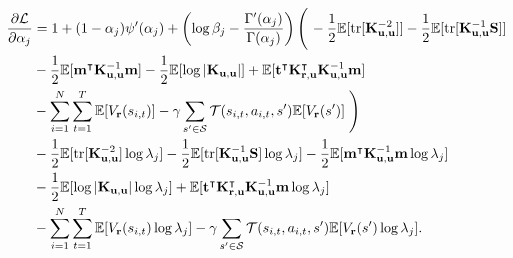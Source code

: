 \documentclass{article}
\theoremstyle{definition}
\theoremstyle{remark}
\DeclareMathOperator{\tr}{tr}
\newcommand{\Kuu}{\mathbf{K}_{\mathbf{u},\mathbf{u}}}
\newcommand{\Kru}{\mathbf{K}_{\mathbf{r},\mathbf{u}}}
\begin{document}
\[
  \begin{split}
    \frac{\partial\mathcal{L}}{\partial\alpha_j} &= 1 + (1 -
    \alpha_j)\psi'(\alpha_j) + \left( \log\beta_j -
      \frac{\Gamma'(\alpha_j)}{\Gamma(\alpha_j)} \right)
    \left(\vphantom{\sum_{i=1}^N} \right. - \frac{1}{2}
    \mathbb{E}[\tr[\Kuu^{-2}]] - \frac{1}{2}\mathbb{E}[\tr[\Kuu^{-1}\mathbf{S}]]
    \\
    &- \frac{1}{2}\mathbb{E}[\mathbf{m}^\intercal\Kuu^{-1}\mathbf{m}] -
    \frac{1}{2}\mathbb{E}[\log|\Kuu|] +
    \mathbb{E}[\mathbf{t}^\intercal\Kru^\intercal\Kuu^{-1}\mathbf{m}] \\
    &- \sum_{i=1}^N \sum_{t=1}^T \mathbb{E}[V_{\mathbf{r}}(s_{i,t})] - \gamma\sum_{s' \in
      \mathcal{S}} \mathcal{T}(s_{i,t}, a_{i,t}, s')\mathbb{E}[V_{\mathbf{r}}(s')] \left.
      \vphantom{\sum_{i=1}^N} \right) \\
    & - \frac{1}{2}\mathbb{E}[\tr[\Kuu^{-2}]\log\lambda_j] -
    \frac{1}{2}\mathbb{E}[\tr[\Kuu^{-1}\mathbf{S}]\log\lambda_j] -
    \frac{1}{2}\mathbb{E}[\mathbf{m}^\intercal\Kuu^{-1}\mathbf{m}\log\lambda_j]
    \\
    &- \frac{1}{2}\mathbb{E}[\log|\Kuu|\log\lambda_j] +
    \mathbb{E}[\mathbf{t}^\intercal\Kru^\intercal\Kuu^{-1}\mathbf{m}\log\lambda_j]
    \\
    &- \sum_{i=1}^N\sum_{t=1}^T\mathbb{E}[V_{\mathbf{r}}(s_{i,t})\log\lambda_j] -
    \gamma\sum_{s' \in \mathcal{S}}\mathcal{T}(s_{i,t}, a_{i,t},
    s')\mathbb{E}[V_{\mathbf{r}}(s')\log\lambda_j].
  \end{split}
\]
\end{document}
